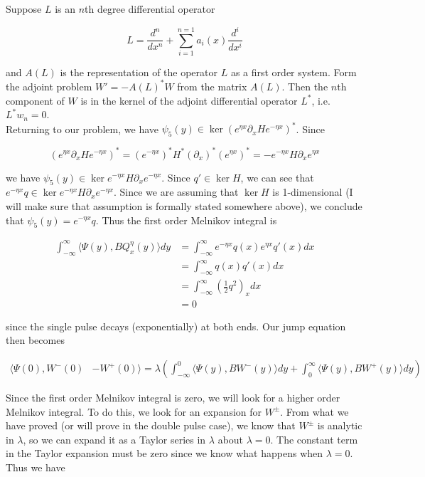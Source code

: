 \documentclass[12pt]{article}
\begin{document}
Suppose $L$ is an $n$th degree differential operator

\[
L = \frac{d^n}{dx^n} + \sum_{i = 1}^{n=1}a_i(x) \frac{d^i}{dx^i}
\]

and $A(L)$ is the representation of the operator $L$ as a first order system. Form the adjoint problem $W' = -A(L)^* W$ from the matrix $A(L)$. Then the $n$th component of $W$ is in the kernel of the adjoint differential operator $L^*$, i.e. $L^* w_n = 0$.\\

Returning to our problem, we have $\psi_5(y) \in \ker (e^{\eta x} \partial_x H e^{-\eta x})^*$. Since

\[
(e^{\eta x} \partial_x H e^{-\eta x})^* = (e^{-\eta x})^* H^* (\partial_x)^* (e^{\eta x})^* = -e^{-\eta x} H \partial_x e^{\eta x}
\]

we have $\psi_5(y) \in \ker e^{-\eta x} H \partial_x e^{-\eta x}$. Since $q' \in \ker H$, we can see that $e^{-\eta x} q \in \ker e^{-\eta x} H \partial_x e^{-\eta x}$. Since we are assuming that $\ker H$ is 1-dimensional (I will make sure that assumption is formally stated somewhere above), we conclude that $\psi_5(y) = e^{-\eta x} q$. Thus the first order Melnikov integral is

\begin{align*}
\int_{-\infty}^\infty \langle\Psi(y), BQ^\eta_x(y) \rangle dy &= \int_{-\infty}^\infty e^{-\eta x} q(x) e^{\eta x} q'(x) dx\\
&= \int_{-\infty}^\infty  q(x) q'(x) dx \\
&= \int_{-\infty}^\infty \left( \frac{1}{2} q^2 \right)_x dx\\
&= 0
\end{align*}

since the single pulse decays (exponentially) at both ends. Our jump equation then becomes

\begin{align*}
\langle\Psi(0), W^-(0) &- W^+(0)\rangle = \lambda\left( \int_{-\infty}^0 \langle \Psi(y), B W^-(y) \rangle dy + \int_0^\infty \langle \Psi(y), B W^+(y) \rangle dy \right)
\end{align*}

Since the first order Melnikov integral is zero, we will look for a higher order Melnikov integral. To do this, we look for an expansion for $W^\pm$. From what we have proved (or will prove in the double pulse case), we know that $W^\pm$ is analytic in $\lambda$, so we can expand it as a Taylor series in $\lambda$ about $\lambda = 0$. The constant term in the Taylor expansion must be zero since we know what happens when $\lambda = 0$. Thus we have
\end{document}
